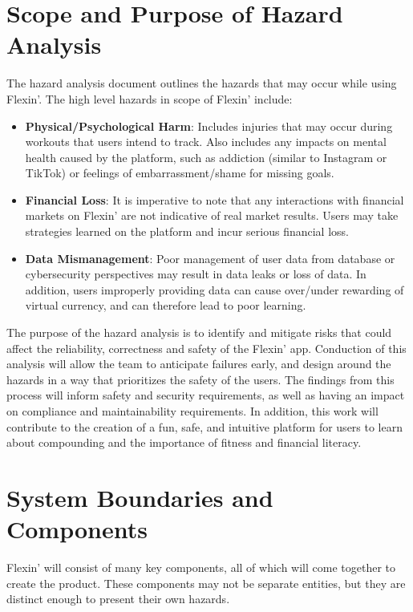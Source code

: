 \documentclass{article}
\begin{document}
\section{Scope and Purpose of Hazard Analysis}

The hazard analysis document outlines the hazards that may occur while using Flexin'.
The high level hazards in scope of Flexin' include:
\begin{itemize}
    \item \textbf{Physical/Psychological Harm}: Includes injuries that may occur during workouts that users intend to track.
    Also includes any impacts on mental health caused by the platform, such as addiction (similar to Instagram or TikTok) or feelings of embarrassment/shame for missing goals.
    \item \textbf{Financial Loss}: It is imperative to note that any interactions with financial markets on Flexin' are not indicative of real market results.
    Users may take strategies learned on the platform and incur serious financial loss.
    \item \textbf{Data Mismanagement}: Poor management of user data from database or cybersecurity perspectives may result in data leaks or loss of data.
    In addition, users improperly providing data can cause over/under rewarding of virtual currency, and can therefore lead to poor learning.
\end{itemize}

The purpose of the hazard analysis is to identify and mitigate risks that could affect the reliability, correctness and safety of the Flexin' app.
Conduction of this analysis will allow the team to anticipate failures early, and design around the hazards in a way that prioritizes the safety of the users.
The findings from this process will inform safety and security requirements, as well as having an impact on compliance and maintainability requirements.
In addition, this work will contribute to the creation of a fun, safe, and intuitive platform for users to learn about compounding and the importance of fitness and financial literacy.

\section{System Boundaries and Components}

Flexin' will consist of many key components, all of which will come together to create the product.
These components may not be separate entities, but they are distinct enough to present their own hazards.
\end{document}
